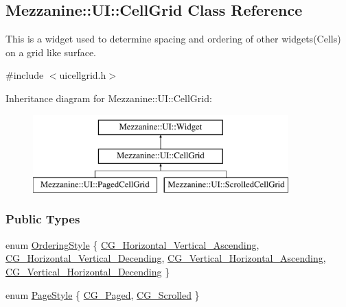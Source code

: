 \hypertarget{classMezzanine_1_1UI_1_1CellGrid}{
\subsection{Mezzanine::UI::CellGrid Class Reference}
\label{classMezzanine_1_1UI_1_1CellGrid}
}


This is a widget used to determine spacing and ordering of other widgets(Cells) on a grid like surface.  




{\ttfamily \#include $<$uicellgrid.h$>$}

Inheritance diagram for Mezzanine::UI::CellGrid:\begin{figure}[H]
\begin{center}
\leavevmode
\includegraphics[height=3.000000cm]{classMezzanine_1_1UI_1_1CellGrid}
\end{center}
\end{figure}
\subsubsection*{Public Types}
\begin{DoxyCompactItemize}
\item 
enum \hyperlink{classMezzanine_1_1UI_1_1CellGrid_ab054f3bbb294e4a584b8ab63b4d3f237}{OrderingStyle} \{ \hyperlink{classMezzanine_1_1UI_1_1CellGrid_ab054f3bbb294e4a584b8ab63b4d3f237ac80523a0d2eb73945ca37ec2084201cc}{CG\_\-Horizontal\_\-Vertical\_\-Ascending}, 
\hyperlink{classMezzanine_1_1UI_1_1CellGrid_ab054f3bbb294e4a584b8ab63b4d3f237acb397ae997902c7ee87ee9d4baf5a272}{CG\_\-Horizontal\_\-Vertical\_\-Decending}, 
\hyperlink{classMezzanine_1_1UI_1_1CellGrid_ab054f3bbb294e4a584b8ab63b4d3f237ac5d880b4c91e25fa0c6d669d539fc405}{CG\_\-Vertical\_\-Horizontal\_\-Ascending}, 
\hyperlink{classMezzanine_1_1UI_1_1CellGrid_ab054f3bbb294e4a584b8ab63b4d3f237a3553f31f94893fccd483e229ddeb7065}{CG\_\-Vertical\_\-Horizontal\_\-Decending}
 \}
\item 
enum \hyperlink{classMezzanine_1_1UI_1_1CellGrid_a6e1e734ffd3425d16a1d86893e362f5e}{PageStyle} \{ \hyperlink{classMezzanine_1_1UI_1_1CellGrid_a6e1e734ffd3425d16a1d86893e362f5ea9570fc60b01bac081ce250aa06868508}{CG\_\-Paged}, 
\hyperlink{classMezzanine_1_1UI_1_1CellGrid_a6e1e734ffd3425d16a1d86893e362f5ea6e8c1247ac9c1803f9a65292047d0522}{CG\_\-Scrolled}
 \}
\end{DoxyCompactItemize}
